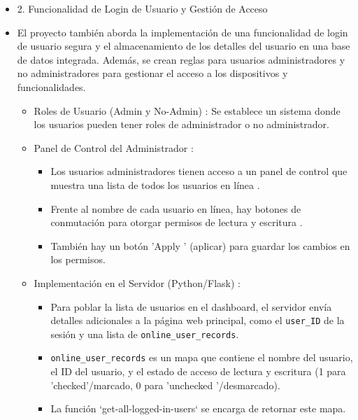 \documentclass{report}
\begin{document}
\begin{itemize}
    \item 2. Funcionalidad de Login de Usuario y Gestión de Acceso
    \item El proyecto también aborda la implementación de una  funcionalidad de login de usuario segura  y el almacenamiento de los detalles del 
    usuario en una base de datos integrada. Además, se crean reglas para usuarios administradores y no administradores para gestionar el 
    acceso a los dispositivos y funcionalidades.
    \begin{itemize}
        \item Roles de Usuario (Admin y No-Admin) : Se establece un sistema donde los usuarios pueden tener roles de administrador o no administrador. 
        
        \item Panel de Control del Administrador :
        \begin{itemize}
            \item Los usuarios administradores tienen acceso a un panel de control que muestra una  lista de todos los usuarios en línea .
            \item Frente al nombre de cada usuario en línea, hay  botones de conmutación para otorgar permisos de lectura y escritura .
            \item También hay un botón  'Apply ' (aplicar) para guardar los cambios en los permisos.        
        \end{itemize}

        \item Implementación en el Servidor (Python/Flask) :
        \begin{itemize}
            \item Para poblar la lista de usuarios en el dashboard, el servidor envía detalles adicionales a la página web principal, como 
            el \verb|user_ID| de la sesión y una lista de \verb|online_user_records|.
            \item \verb|online_user_records| es un mapa que contiene el nombre del usuario, el ID del usuario, y el estado de acceso de lectura 
            y escritura (1 para 'checked'/marcado, 0 para  'unchecked '/desmarcado).
            \item La función `get-all-logged-in-users` se encarga de retornar este mapa.
        \end{itemize}


\end{itemize}
\end{itemize}
\end{document}
